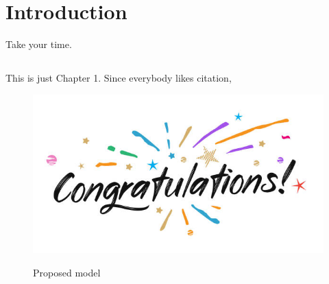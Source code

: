 \chapter{Introduction}

Take your time.

\section{}

This is just Chapter 1.
Since everybody likes citation, 

\begin{figure}[!ht]
		\centering
\caption{Proposed  model}
	\vspace{.1in}  %
 \includegraphics[width = 0.9 \textwidth ]{fig/congrats.jpg}			
 \label{fig:congrats}
\end{figure}



